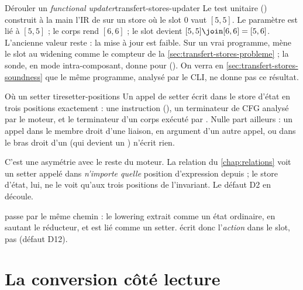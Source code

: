 \begin{exemple}{Dérouler un \emph{functional updater}}{transfert-stores-updater}
  Le test unitaire 
  () construit à la main
  l'IR de  sur un store où le slot $0$ vaut $[5,5]$.
  Le paramètre  est lié à $[5,5]$ ; le corps rend $[6,6]$ ; le slot
  devient $[5,5] \join [6,6] = [5,6]$. L'ancienne valeur reste : la mise à
  jour est faible. Sur un vrai programme,
   mène le slot au widening comme le
  compteur de la \cref{sec:transfert-stores-probleme} ; la sonde, en mode
  intra-composant, donne  pour
   (). On verra en
  \cref{sec:transfert-stores-soundness} que le même programme, analysé par
  le CLI, ne donne pas ce résultat.
\end{exemple}

\begin{invariant}{Où un setter tire}{setter-positions}
  Un appel de setter écrit dans le store d'état en trois positions
  exactement : une instruction  (), un
  terminateur  de CFG analysé par le moteur, et le terminateur
   d'un corps exécuté par . Nulle part
  ailleurs : un appel dans le membre droit d'une liaison, en argument d'un
  autre appel, ou dans le bras droit d'un \code{&&} (qui devient un
  ) n'écrit rien.
\end{invariant}

C'est une asymétrie avec le reste du moteur. La relation
 du \cref{chap:relations} voit un setter appelé dans
\emph{n'importe quelle} position d'expression depuis  ; le store
d'état, lui, ne le voit qu'aux trois positions de l'invariant. Le défaut D2
en découle.

\begin{remarque}
   passe par le même chemin : le lowering extrait
   comme un état ordinaire, en sautant le
  réducteur, et  est lié comme un setter. 
  écrit donc l'\emph{action}  dans le slot, pas
   (défaut D12).
\end{remarque}

\section{La conversion côté lecture}
\label{sec:transfert-stores-lecture}

